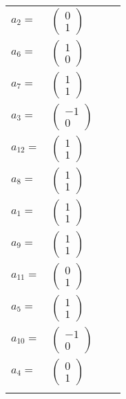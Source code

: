 \documentclass[1p]{elsarticle_modified}
\theoremstyle{definition}
\begin{document}
\begin{tabular}{m{7pt} m{180pt} m{7pt} m{180pt} }
\flushright $a_{2}=$&$\begin{pmatrix}0\\1\end{pmatrix}$ \\
\flushright $a_{6}=$&$\begin{pmatrix}1\\0\end{pmatrix}$ \\
\flushright $a_{7}=$&$\begin{pmatrix}1\\1\end{pmatrix}$ \\
\flushright $a_{3}=$&$\begin{pmatrix}-1\\0\end{pmatrix}$ \\
\flushright $a_{12}=$&$\begin{pmatrix}1\\1\end{pmatrix}$ \\
\flushright $a_{8}=$&$\begin{pmatrix}1\\1\end{pmatrix}$ \\
\flushright $a_{1}=$&$\begin{pmatrix}1\\1\end{pmatrix}$ \\
\flushright $a_{9}=$&$\begin{pmatrix}1\\1\end{pmatrix}$ \\
\flushright $a_{11}=$&$\begin{pmatrix}0\\1\end{pmatrix}$ \\
\flushright $a_{5}=$&$\begin{pmatrix}1\\1\end{pmatrix}$ \\
\flushright $a_{10}=$&$\begin{pmatrix}-1\\0\end{pmatrix}$ \\
\flushright $a_{4}=$&$\begin{pmatrix}0\\1\end{pmatrix}$\\&\end{tabular}
\end{document}
